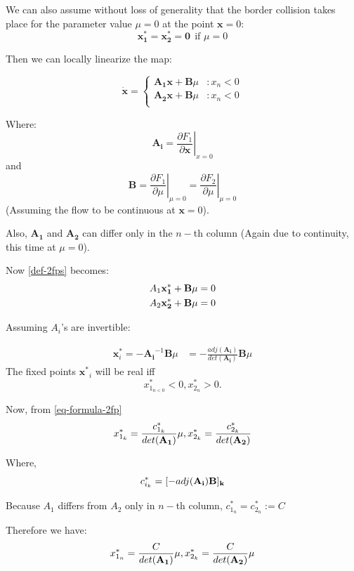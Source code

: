 \documentclass{book}
\renewcommand{\(}{\begin{columns}}
\renewcommand{\)}{\end{columns}}
\newcommand{\<}[1]{\begin{column}{#1}}
\renewcommand{\>}{\end{column}}
\newcommand{\mb}[1]{\mathbf{#1}}
\begin{document}
We can also assume without loss of generality that the border collision takes 
place for the parameter value $\mu=0$ at the point $\mb{x}=0$:
\[
\mb{x_1^*}=\mb{x_2^*}=\mb{0}~~\text{if } \mu=0
\]


Then we can locally linearize the map:

\begin{displaymath}
   \dot{\mb{x}} = \left\{
     \begin{array}{lr}
       \mb{A_1x+B}\mu & : x_n<0\\
       \mb{A_2x+B}\mu & : x_n<0\\
     \end{array}
   \right.
\end{displaymath}

Where:\\
\[
\mb{A_i}=\left.  \frac{\partial F_1}{\partial \mb{x}}\right|_{x=0}
\]
and 
\[
\mb{B}=\left.  \frac{\partial F_1}{\partial \mu}\right|_{\mu=0}=\left.  \frac{\partial F_2}{\partial \mu}\right|_{\mu=0}
\]
(Assuming the flow to be continuous at $\mb{x}=0$).

Also, $\mb{A_1}$ and $\mb{A_2}$ can differ only in the $n-$th column (Again 
due to continuity, this time at $\mu=0$).


Now \eqref{def-2fps} becomes:
\begin{align}
A_1\bf{x}^*_1+\bf{B}\mu&=0\\
A_2\bf{x}^*_2+\bf{B}\mu&=0
\end{align}


Assuming $A_i$'s are invertible:

\begin{align}
\label{eq-formula-2fp}
\mb{x}^*_i=-\mb{A_i}^{-1}\mb{B}\mu&=-\frac{adj(\mb{A_i})}{det(\mb{A_i})}\mb{B}\mu
\end{align}
The fixed points $\mb{x^*}_i$ will be real iff
\[
x^*_{1_{n<0}}<0, x^*_{2{_n}}>0. 
\]  

Now, from \eqref{eq-formula-2fp}
\begin{equation}
\label{eq-formula2-2fp}
x^*_{1_k}=\frac{c^*_{1_k}}{det(\bf{A_1})}\mu, x^*_{2_k}=\frac{c^*_{2_k}}{det(\bf{A_2})}
\end{equation}

Where, \[
c^*_{i_k}=[-adj(\bf{A_i)B}]_k
\]

Because $A_1$ differs from $A_2$ only in $n-$th column, $c^*_{1_n}=c^*_{2_n}:=C$

Therefore we have:
\begin{equation}
\label{eq-final-form-2fps}
x^*_{1_n}=\frac{C}{det(\bf{A_1})}\mu, x^*_{2_k}=\frac{C}{det(\bf{A_2})}\mu
\end{equation}
\end{document}
